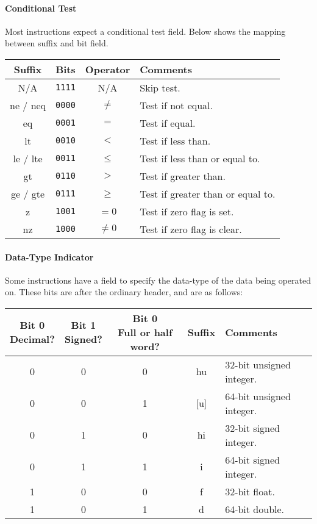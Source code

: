 \documentclass[10pt]{article}
\begin{document}
    \paragraph{Conditional Test}
    Most instructions expect a conditional test field.
    Below shows the mapping between suffix and bit field.

    \medskip
    \begin{tabular}{|c|c|c|l|}
        \hline
        \textbf{Suffix} & \textbf{Bits} & \textbf{Operator} & \textbf{Comments} \\
        \hline
        N/A & \texttt{1111} & N/A & Skip test. \\
        \hline
        ne / neq & \texttt{0000} & \(\neq\) & Test if not equal. \\
        eq & \texttt{0001} & \(=\) & Test if equal. \\
        \hline
        lt & \texttt{0010} & \(<\) & Test if less than. \\
        le / lte & \texttt{0011} & \(\le\) & Test if less than or equal to. \\
        \hline
        gt & \texttt{0110} & \(>\) & Test if greater than. \\
        ge / gte & \texttt{0111} & \(\ge\) & Test if greater than or equal to. \\
        \hline
        z & \texttt{1001} & \(= 0\) & Test if zero flag is set. \\
        nz & \texttt{1000} & \(\neq 0\) & Test if zero flag is clear. \\
        \hline
    \end{tabular}

    \paragraph{Data-Type Indicator}
    Some instructions have a field to specify the data-type of the data being operated on.
    These bits are after the ordinary header, and are as follows:

    \bigskip
    \begin{tabular}{|c|c|c||c|l|}
        \hline
        \makecell[c]{\textbf{Bit 0}\\Decimal?} & \makecell[c]{\textbf{Bit 1}\\Signed?} & \makecell[c]{\textbf{Bit 0}\\Full or half word?} & \textbf{Suffix} & \textbf{Comments} \\
        \hline
        0 & 0 & 0 & hu & 32-bit unsigned integer. \\
        \hline
        0 & 0 & 1 & [u] & 64-bit unsigned integer. \\
        \hline
        0 & 1 & 0 & hi & 32-bit signed integer. \\
        \hline
        0 & 1 & 1 & i & 64-bit signed integer. \\
        \hline
        1 & 0 & 0 & f & 32-bit float. \\
        \hline
        1 & 0 & 1 & d & 64-bit double. \\
        \hline
    \end{tabular}
\end{document}
